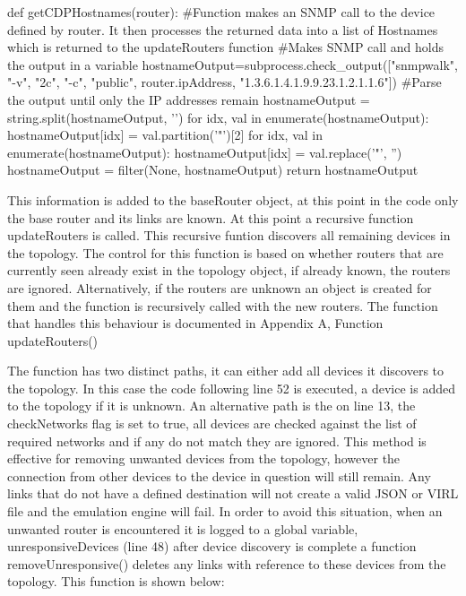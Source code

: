 \documentclass[11pt]{report}
\begin{document}
\begin{python}
	def getCDPHostnames(router):
	#Function makes an SNMP call to the device defined by router. It then processes the returned data into a list of Hostnames which is returned to the updateRouters function
	#Makes SNMP call and holds the output in a variable
	hostnameOutput=subprocess.check_output(["snmpwalk", "-v", "2c", "-c", "public", router.ipAddress, "1.3.6.1.4.1.9.9.23.1.2.1.1.6"])
	#Parse the output until only the IP addresses remain
	hostnameOutput = string.split(hostnameOutput, '\n')
	for idx, val in enumerate(hostnameOutput):
		hostnameOutput[idx] = val.partition('"')[2]
	for idx, val in enumerate(hostnameOutput):
		hostnameOutput[idx] = val.replace('"', '')
	hostnameOutput = filter(None, hostnameOutput)
	return hostnameOutput
\end{python}

This information is added to the baseRouter object, at this point in the code only the base router and its links are known. At this point a recursive function updateRouters is called. This recursive funtion discovers all remaining devices in the topology. The control for this function is based on whether routers that are currently seen already exist in the topology object, if already known, the routers are ignored. Alternatively, if the routers are unknown an object is created for them and the function is recursively called with the new routers. The function that handles this behaviour is documented in Appendix A, Function updateRouters()

The function has two distinct paths, it can either add all devices it discovers to the topology. In this case the code following line 52 is executed, a device is added to the topology if it is unknown. An alternative path is the on line 13, the checkNetworks flag is set to true, all devices are checked against the list of required networks and if any do not match they are ignored. This method is effective for removing unwanted devices from the topology, however the connection from other devices to the device in question will still remain. Any links that do not have a defined destination will not create a valid JSON or VIRL file and the emulation engine will fail. In order to avoid this situation, when an unwanted router is encountered it is logged to a global variable, unresponsiveDevices (line 48) after device discovery is complete a function removeUnresponsive() deletes any links with reference to these devices from the topology. This function is shown below:
\end{document}
